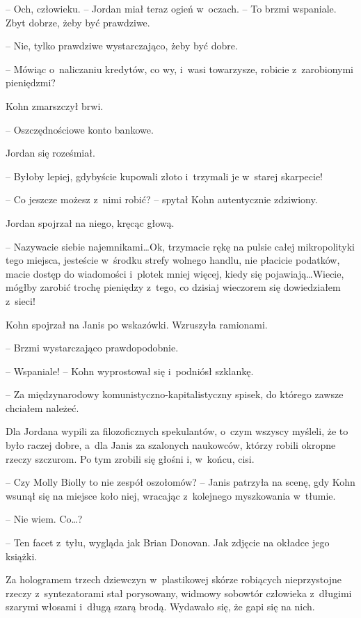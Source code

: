 \documentclass[oneside,polish,11pt,sfheadings]{mwbk}
\begin{document}
-- Och, człowieku. -- Jordan miał teraz ogień w~oczach. -- To brzmi
wspaniale. Zbyt dobrze, żeby być prawdziwe.

-- Nie, tylko prawdziwe wystarczająco, żeby być dobre.

-- Mówiąc o~naliczaniu kredytów, co wy, i~wasi towarzysze, robicie z~zarobionymi pieniędzmi?

Kohn zmarszczył brwi. 

-- Oszczędnościowe konto bankowe.

Jordan się roześmiał. 

-- Byłoby lepiej, gdybyście kupowali złoto i~trzymali je w~starej skarpecie!

-- Co jeszcze możesz z~nimi robić? -- spytał Kohn autentycznie zdziwiony.

Jordan spojrzał na niego, kręcąc głową. 

-- Nazywacie siebie
najemnikami\ldots Ok, trzymacie rękę na pulsie całej mikropolityki tego
miejsca, jesteście w~środku strefy wolnego handlu, nie płacicie
podatków, macie dostęp do wiadomości i~plotek mniej więcej, kiedy się
pojawiają\ldots Wiecie, mógłby zarobić trochę pieniędzy z~tego, co dzisiaj
wieczorem się dowiedziałem z~sieci!

Kohn spojrzał na Janis po wskazówki. Wzruszyła ramionami. 

-- Brzmi
wystarczająco prawdopodobnie.

-- Wspaniale! -- Kohn wyprostował się i~podniósł szklankę. 

-- Za
międzynarodowy komunistyczno-kapitalistyczny spisek, do którego zawsze
chciałem należeć.

Dla Jordana wypili za filozoficznych spekulantów, o~czym wszyscy
myśleli, że to było raczej dobre, a~dla Janis za szalonych naukowców,
którzy robili okropne rzeczy szczurom. Po tym zrobili się głośni i, w~końcu, cisi. 


-- Czy Molly Biolly to nie zespół oszołomów? -- Janis
patrzyła na scenę, gdy Kohn wsunął się na miejsce koło niej, wracając z~kolejnego myszkowania w~tłumie.

-- Nie wiem. Co\ldots?

-- Ten facet z~tyłu, wygląda jak Brian Donovan. Jak zdjęcie na okładce
jego książki.

Za hologramem trzech dziewczyn w~plastikowej skórze robiących
nieprzystojne rzeczy z~syntezatorami stał porysowany, widmowy sobowtór
człowieka z~długimi szarymi włosami i~długą szarą brodą. Wydawało się,
że gapi się na nich.
\end{document}
